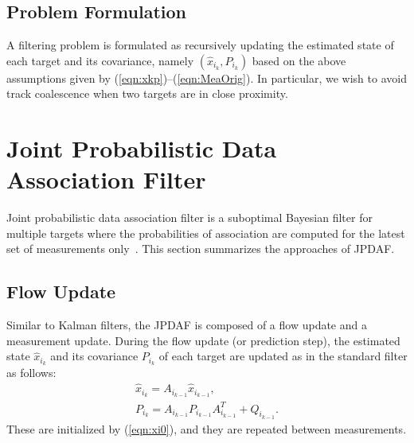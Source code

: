 \documentclass[letterpaper, 10pt, conference]{ieeeconf}
\newcommand{\refeqn}[1]{(\ref{eqn:#1})}
\begin{document}
\subsection{Problem Formulation}

A filtering problem is formulated as recursively updating the estimated state of each target and its covariance, namely $(\hat x_{i_k}, P_{i_k})$ based on the above assumptions given by \refeqn{xkp}--\refeqn{MeaOrig}. In particular, we wish to avoid track coalescence when two targets are in close proximity. 




		


\section{Joint Probabilistic Data Association Filter}
\label{JPDAF}

Joint probabilistic data association filter is a suboptimal Bayesian filter for multiple targets where the probabilities of association are computed for the latest set of measurements only~\cite{TrackDataAssoc}. This section summarizes the approaches of JPDAF. 

\subsection{Flow Update}
Similar to Kalman filters, the JPDAF is composed of a flow update and a measurement update. During the flow update (or prediction step), the estimated state $\hat x_{i_k}$ and its covariance $P_{i_k}$ of each target are updated as in the standard filter as follows:
\begin{gather}
\hat x_{i_{k}} = A_{i_{k-1}} \hat x_{i_{k-1}},\\
P_{i_{k}} = A_{i_{k-1}} P_{i_{k-1}} A_{i_{k-1}}^T + Q_{i_{k-1}}.
\end{gather}
These are initialized by \refeqn{xi0}, and they are repeated between measurements. 
\end{document}
